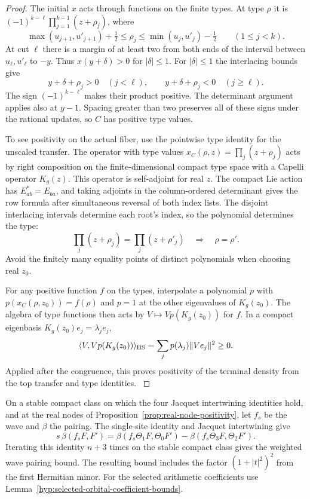 \begin{proof}
The initial \(x\) acts through functions on the finite types.
At type \(\rho\) it is
\((-1)^{k-\ell}\prod_{j=1}^{k-1}(z+\rho_j)\), where
\begin{equation}\label{eq:word-type-interlacing}
 \max(u_{j+1},u'_{j+1})+\tfrac12
 \le \rho_j \le \min(u_j,u'_j)-\tfrac12
 \qquad(1\le j<k).
\end{equation}
At cut \(\ell\) there is a margin of at least two from both
ends of the interval between \(u_\ell,u'_\ell\) to \(-y\).
Thus \(x(y+\delta)>0\) for \(|\delta|\le1\). For \(|\delta|\le1\) the interlacing bounds give
\[
  y+\delta+\rho_j>0\quad(j<\ell),\qquad
  y+\delta+\rho_j<0\quad(j\ge\ell).
\]
The sign \((-1)^{k-\ell}\) makes their product positive.
The determinant argument applies also at \(y-1\). Spacing greater than
two preserves all of these signs under the rational
updates, so \(C\) has positive type values.


To see positivity on the actual fiber, use the pointwise
type identity for the unscaled transfer. The operator
with type values \(x_C(\rho,z)=\prod_j(z+\rho_j)\) acts by
right composition on the finite-dimensional compact
type space with a Capelli operator \(K_g(z)\).
This operator is self-adjoint for real \(z\).
The compact Lie action has \(E_{ab}^*=E_{ba}\), and taking
adjoints in the column-ordered determinant gives the
row formula after simultaneous reversal of both index
lists. The disjoint interlacing intervals determine each root's
index, so the polynomial determines the type:
\[
 \prod_j(z+\rho_j)=\prod_j(z+\rho'_j)\quad\Longrightarrow\quad\rho=\rho'.
\]
Avoid the finitely many equality points of distinct polynomials
when choosing real \(z_0\).

For any positive function \(f\) on the
types, interpolate a polynomial \(p\) with
\(p(x_C(\rho,z_0))=f(\rho)\) and \(p=1\) at the other
eigenvalues of \(K_g(z_0)\). The algebra of type functions
then acts by \(V\mapsto Vp(K_g(z_0))\) for \(f\).
In a compact eigenbasis \(K_g(z_0)e_j=\lambda_j e_j\),
\[
       \langle V,Vp(K_g(z_0))\rangle_{\rm HS}
        =\sum_j p(\lambda_j)\|Ve_j\|^2\ge0 .
\] Applied after the congruence, this proves
positivity of the terminal density from the top transfer
and type identities. \label{cor:word-pairing-2}

\end{proof}

\begin{proposition}\label{prop:wave-pairing-decay}
On a stable compact class on which the four Jacquet intertwining
identities hold, and at the real nodes of
Proposition~\ref{prop:real-node-positivity}, let \(f_s\) be the wave and \(\beta\) the pairing. The single-site identity and Jacquet intertwining give 
\[
 s\,\beta(f_s F,F')=\beta(f_s\Theta_1 F,\Theta_0 F')-\beta(f_s\Theta_3 F,\Theta_2 F').
\]
 Iterating this identity \(n+3\) times on the stable compact class gives the weighted wave pairing bound.
The resulting bound includes the factor \((1+|t|^2)^2\)
from the first Hermitian minor. For the selected arithmetic
coefficients use Lemma~\ref{hyp:selected-orbital-coefficient-bounds}.
\end{proposition}

